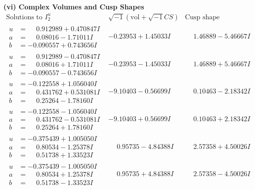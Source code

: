 \documentclass[1p]{elsarticle_modified}
\theoremstyle{definition}
\newcommand{\I}{\sqrt{-1}}
\begin{document}
\newpage\flushleft \textbf{(vi) Complex Volumes and Cusp Shapes}
$$\begin{array}{c|c|c}  
\text{Solutions to }I^u_{2}& \I (\text{vol} + \sqrt{-1}CS) & \text{Cusp shape}\\
 \hline 
\begin{aligned}
u &= \phantom{-}0.912989 + 0.470847 I \\
a &= \phantom{-}0.08016 - 1.71011 I \\
b &= -0.090557 + 0.743656 I\end{aligned}
 & -0.23953 + 1.45033 I & \phantom{-}1.46889 - 5.46667 I \\ \hline\begin{aligned}
u &= \phantom{-}0.912989 - 0.470847 I \\
a &= \phantom{-}0.08016 + 1.71011 I \\
b &= -0.090557 - 0.743656 I\end{aligned}
 & -0.23953 - 1.45033 I & \phantom{-}1.46889 + 5.46667 I \\ \hline\begin{aligned}
u &= -0.122558 + 1.056040 I \\
a &= \phantom{-}0.431762 + 0.531081 I \\
b &= \phantom{-}0.25264 - 1.78160 I\end{aligned}
 & -9.10403 - 0.56699 I & \phantom{-}0.10463 - 2.18342 I \\ \hline\begin{aligned}
u &= -0.122558 - 1.056040 I \\
a &= \phantom{-}0.431762 - 0.531081 I \\
b &= \phantom{-}0.25264 + 1.78160 I\end{aligned}
 & -9.10403 + 0.56699 I & \phantom{-}0.10463 + 2.18342 I \\ \hline\begin{aligned}
u &= -0.375439 + 1.005050 I \\
a &= \phantom{-}0.80534 - 1.25378 I \\
b &= \phantom{-}0.51738 + 1.33523 I\end{aligned}
 & \phantom{-}0.95735 - 4.84388 I & \phantom{-}2.57358 + 4.50026 I \\ \hline\begin{aligned}
u &= -0.375439 - 1.005050 I \\
a &= \phantom{-}0.80534 + 1.25378 I \\
b &= \phantom{-}0.51738 - 1.33523 I\end{aligned}
 & \phantom{-}0.95735 + 4.84388 I & \phantom{-}2.57358 - 4.50026 I \\ \hline\begin{aligned}

\end{aligned}
\end{array}$$
\end{document}

